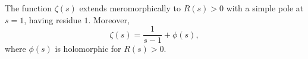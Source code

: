 The function $\zeta(s)$ extends meromorphically to $R(s) > 0$ with a simple pole at $s=1$, having residue $1$. Moreover,
$$
\zeta(s) = \frac{1}{s-1} + \phi(s),
$$
where $\phi(s)$ is holomorphic for $R(s) > 0$.
